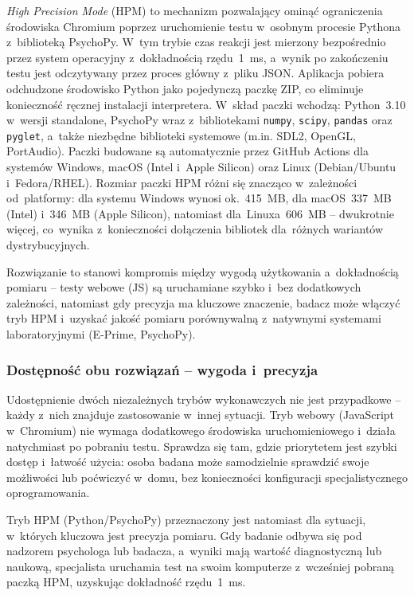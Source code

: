 \documentclass[12pt, a4paper, oneside]{report}
\begin{document}
\emph{High Precision Mode} (HPM) to mechanizm pozwalający ominąć ograniczenia środowiska Chromium poprzez uruchomienie testu w~osobnym procesie Pythona z~biblioteką PsychoPy. W~tym trybie czas reakcji jest mierzony bezpośrednio przez system operacyjny z~dokładnością rzędu~1~ms, a~wynik po zakończeniu testu jest odczytywany przez proces główny z~pliku JSON. Aplikacja pobiera odchudzone środowisko Python jako pojedynczą paczkę ZIP, co eliminuje konieczność ręcznej instalacji interpretera. W~skład paczki wchodzą: Python~3.10 w~wersji standalone, PsychoPy wraz z~bibliotekami \texttt{numpy}, \texttt{scipy}, \texttt{pandas} oraz \texttt{pyglet}, a~także niezbędne biblioteki systemowe (m.in. SDL2, OpenGL, PortAudio). Paczki budowane są automatycznie przez GitHub Actions dla systemów Windows, macOS (Intel i~Apple Silicon) oraz Linux (Debian/Ubuntu i~Fedora/RHEL). Rozmiar paczki HPM różni się znacząco w~zależności od~platformy: dla systemu Windows wynosi ok.~415~MB, dla macOS~337~MB (Intel) i~346~MB (Apple Silicon), natomiast dla~Linuxa~606~MB -- dwukrotnie więcej, co~wynika z~konieczności dołączenia bibliotek dla~różnych wariantów dystrybucyjnych.

Rozwiązanie to stanowi kompromis między wygodą użytkowania a~dokładnością pomiaru -- testy webowe (JS) są uruchamiane szybko i~bez dodatkowych zależności, natomiast gdy precyzja ma kluczowe znaczenie, badacz może włączyć tryb HPM i~uzyskać jakość pomiaru porównywalną z~natywnymi systemami laboratoryjnymi (E-Prime, PsychoPy).

\subsubsection{Dostępność obu rozwiązań -- wygoda i~precyzja}
\label{subsec:oba-rozwiazania}

Udostępnienie dwóch niezależnych trybów wykonawczych nie jest przypadkowe -- każdy z~nich znajduje zastosowanie w~innej sytuacji. Tryb webowy (JavaScript w~Chromium) nie wymaga dodatkowego środowiska uruchomieniowego i~działa natychmiast po pobraniu testu. Sprawdza się tam, gdzie priorytetem jest szybki dostęp i~łatwość użycia: osoba badana może samodzielnie sprawdzić swoje możliwości lub poćwiczyć w~domu, bez konieczności konfiguracji specjalistycznego oprogramowania.

Tryb HPM (Python/PsychoPy) przeznaczony jest natomiast dla sytuacji, w~których kluczowa jest precyzja pomiaru. Gdy badanie odbywa się pod nadzorem psychologa lub badacza, a~wyniki mają wartość diagnostyczną lub naukową, specjalista uruchamia test na swoim komputerze z~wcześniej pobraną paczką HPM, uzyskując dokładność rzędu~1~ms.
\end{document}
